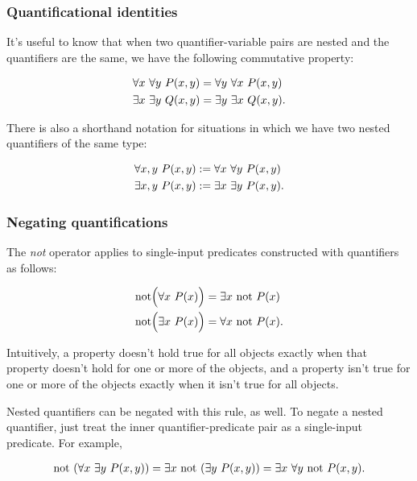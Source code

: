 \subsubsection*{Quantificational identities}

It's useful to know that when two quantifier-variable pairs are nested and the quantifiers are the same, we have the following commutative property:

\begin{align*}
    &\forall x \text{ } \forall y \text{ } P(x, y) = \forall y \text{ } \forall x \text{ } P(x, y) \\
    &\exists x \text{ } \exists y \text{ } Q(x, y) = \exists y \text{ } \exists x \text{ } Q(x, y).
\end{align*}

There is also a shorthand notation for situations in which we have two nested quantifiers of the same type:

\begin{align*}
    &\forall x, y \text{ } P(x, y) := \forall x \text{ } \forall y \text{ } P(x, y) \\
    &\exists x, y \text{ } P(x, y) := \exists x \text{ } \exists y \text{ } P(x, y).
\end{align*}


\subsubsection*{Negating quantifications}

The \textit{not} operator applies to single-input predicates constructed with quantifiers as follows:

\begin{align*}
    \text{not}\Big( \forall x \text{ } P(x) \Big) &= \exists x \text{ } \text{not } P(x) \\
    \text{not}\Big( \exists x \text{ } P(x) \Big) &= \forall x \text{ } \text{not } P(x).
\end{align*}

Intuitively, a property doesn't hold true for all objects exactly when that property doesn't hold for one or more of the objects, and a property isn't true for one or more of the objects exactly when it isn't true for all objects.

Nested quantifiers can be negated with this rule, as well. To negate a nested quantifier, just treat the inner quantifier-predicate pair as a single-input predicate. For example,

\begin{align*}
    \text{not }(\forall x \text{ } \exists y \text{ } P(x, y)) = \exists x \text{ } \text{not } (\exists y \text{ } P(x, y)) = \exists x \text{ } \forall y \text{ } \text{not } P(x, y).
\end{align*}

